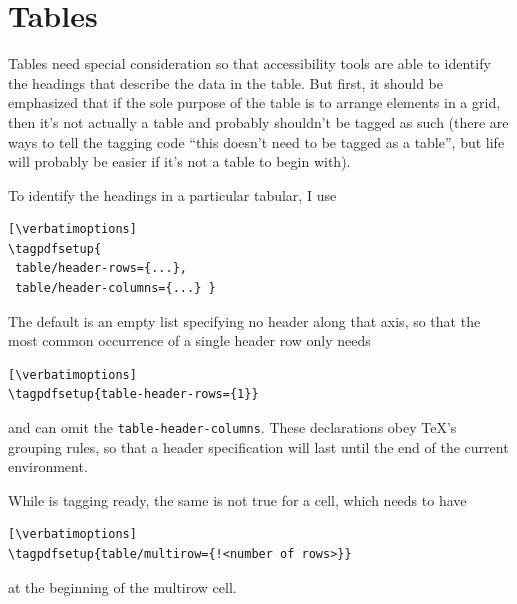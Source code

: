 \documentclass{ltugboat}
\newcommand{\verbatimoptions}{%
 \IfDocumentMetadataT{setup-code=}\small\makevmeta
}
\begin{document}

\section{Tables}

Tables need special consideration so that accessibility tools
are able to identify the headings that describe the data in the table.
But first, it should be emphasized that if the sole purpose of the table
is to arrange elements in a grid,
then it's not actually a table and probably shouldn't be tagged as such
(there are ways to tell the tagging code
``this doesn't need to be tagged as a table'',
but life will probably be easier if it's not a table to begin with).

To identify the headings in a particular tabular, I use
\begin{verbatim}[\verbatimoptions]
\tagpdfsetup{
 table/header-rows={...},
 table/header-columns={...} }
\end{verbatim}
The default is an empty list specifying no header along that axis,
so that the most common occurrence of a single header row only needs
\begin{verbatim}[\verbatimoptions]
\tagpdfsetup{table-header-rows={1}}
\end{verbatim}
and can omit the \texttt{table-header-columns}.
These declarations obey \TeX's grouping rules, so that a header
specification will last until the end of the current environment.

While  is tagging ready, the same is not true for
a  cell, which needs to have
%
%
\begin{verbatim}[\verbatimoptions]
\tagpdfsetup{table/multirow={!<number of rows>}}
\end{verbatim}
at the beginning of the multirow cell.
\end{document}
